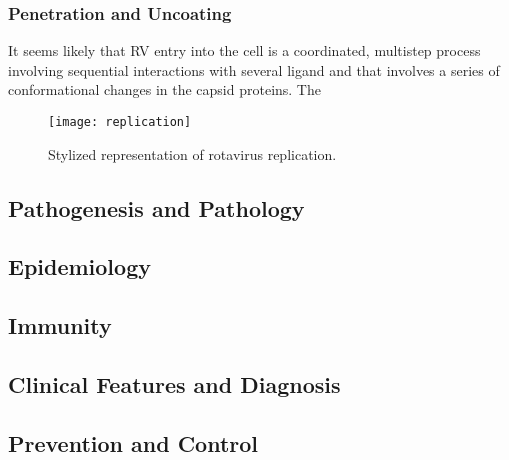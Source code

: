 \subsubsection{Penetration and Uncoating}

It seems likely that RV entry into the cell is a coordinated, multistep process involving sequential interactions with several ligand and that involves a series of conformational changes in the capsid proteins. The

\begin{landscape}
\begin{figure}[htp]
\texttt{[image: replication]}\\
\caption{Stylized representation of rotavirus replication.}
\end{figure}
\end{landscape}

\subsection{Pathogenesis and Pathology}

\subsection{Epidemiology}

\subsection{Immunity}

\subsection{Clinical Features and Diagnosis}

\subsection{Prevention and Control}